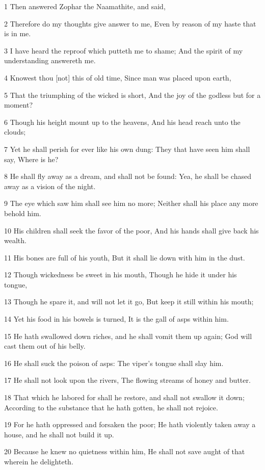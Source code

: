 \par 1 Then answered Zophar the Naamathite, and said,
\par 2 Therefore do my thoughts give answer to me, Even by reason of my haste that is in me.
\par 3 I have heard the reproof which putteth me to shame; And the spirit of my understanding answereth me.
\par 4 Knowest thou [not] this of old time, Since man was placed upon earth,
\par 5 That the triumphing of the wicked is short, And the joy of the godless but for a moment?
\par 6 Though his height mount up to the heavens, And his head reach unto the clouds;
\par 7 Yet he shall perish for ever like his own dung: They that have seen him shall say, Where is he?
\par 8 He shall fly away as a dream, and shall not be found: Yea, he shall be chased away as a vision of the night.
\par 9 The eye which saw him shall see him no more; Neither shall his place any more behold him.
\par 10 His children shall seek the favor of the poor, And his hands shall give back his wealth.
\par 11 His bones are full of his youth, But it shall lie down with him in the dust.
\par 12 Though wickedness be sweet in his mouth, Though he hide it under his tongue,
\par 13 Though he spare it, and will not let it go, But keep it still within his mouth;
\par 14 Yet his food in his bowels is turned, It is the gall of asps within him.
\par 15 He hath swallowed down riches, and he shall vomit them up again; God will cast them out of his belly.
\par 16 He shall suck the poison of asps: The viper's tongue shall slay him.
\par 17 He shall not look upon the rivers, The flowing streams of honey and butter.
\par 18 That which he labored for shall he restore, and shall not swallow it down; According to the substance that he hath gotten, he shall not rejoice.
\par 19 For he hath oppressed and forsaken the poor; He hath violently taken away a house, and he shall not build it up.
\par 20 Because he knew no quietness within him, He shall not save aught of that wherein he delighteth.
